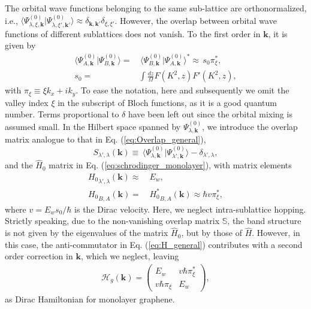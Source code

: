 \documentclass[showpacs,aps,prb,reprint,twocolumn]{revtex4-1}
\begin{document}
The orbital wave functions belonging to the same sub-lattice are orthonormalized, i.e., $\langle \Psi_{\lambda,\xi,\boldsymbol{k}}^{(0)}|\Psi_{\lambda,\xi',\boldsymbol{k}'}^{(0)} \rangle \approx \delta_{\boldsymbol{k},\boldsymbol{k}'} \delta_{\xi,\xi'}$. However, the overlap between orbital wave functions of different sublattices does not vanish. To the first order in $\boldsymbol{k}$, it is given by
\begin{align}
\langle \Psi_{A,\boldsymbol{k}}^{(0)}|\Psi_{B,\boldsymbol{k}}^{(0)}\rangle =&\,
\langle \Psi_{B,\boldsymbol{k}}^{(0)}|\Psi_{A,\boldsymbol{k}}^{(0)}\rangle^* \approx \,
s_0 \pi^*_\xi,\\
s_0 =& \int \frac{dz}{\Omega} F(K^2,z)F'(K^2,z),\nonumber 
\end{align}
with $\pi_\xi\equiv \xi k_x+ik_y$. To ease the notation, here and subsequently we omit the valley index $\xi$ in the subscript of Bloch functions, as it is a good quantum number. Terms proportional to $\delta$
have been left out since the orbital mixing is assumed small. In the Hilbert space spanned by $\Psi_{\lambda,\boldsymbol{k}}^{(0)}$, we introduce the overlap matrix analogue to that in Eq. (\ref{eq:Overlap_general}),
\begin{equation}\label{eq:Overlap_MLG}
S_{\lambda',\lambda}(\boldsymbol{k})\equiv\,
\langle \Psi_{\lambda,\boldsymbol{k}}^{(0)}|
\Psi_{\lambda',\boldsymbol{k}}^{(0)}\rangle -
\delta_{\lambda',\lambda},
\end{equation}
and the $\hat{H}_0$ matrix in Eq. (\ref{eq:schrodinger_monolayer}), with matrix elements
\begin{subequations}\label{eq:Ham_MLG}
\begin{align}
{H_0}_{\lambda',\lambda}(\boldsymbol{k}) \approx & \, E_w, \\
{H_0}_{B,A}(\boldsymbol{k}) = &\, 
{H^*_0}_{B,A}(\boldsymbol{k}) \approx \hbar v \pi^*_\xi,
\end{align}
\end{subequations}
where $v = E_ws_0/\hbar$ is the Dirac velocity. Here, we neglect intra-sublattice hopping. Strictly speaking, due to the non-vanishing overlap matrix $\mathbb{S}$, the band structure is not given by the eigenvalues of the matrix $\hat{H}_0$, but by those of $\hat{H}$. However, in this case, the anti-commutator in Eq. (\ref{eq:H_general}) contributes with a second order correction \cite{McCann_2013} in $\boldsymbol{k}$, which we neglect, leaving 
\begin{align}\label{eq:Ham_MLG}
\mathcal{H}_g(\boldsymbol{k}) =
\left(
\begin{matrix}
E_w&v\hbar\pi_\xi^*\\
v\hbar\pi_\xi&E_w
\end{matrix}
\right),
\end{align}
as Dirac Hamiltonian for monolayer graphene. 
\end{document}
